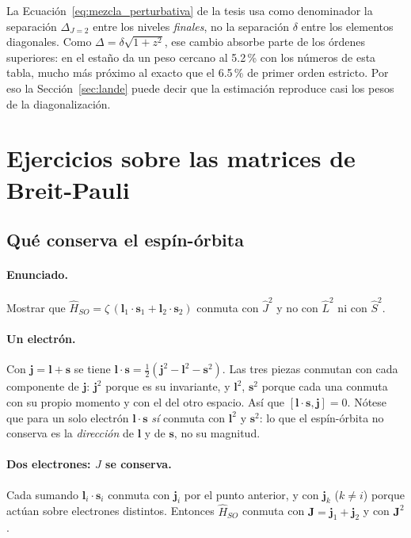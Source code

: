 \documentclass[11pt,a4paper]{article}
\begin{document}
La Ecuación~\eqref{eq:mezcla_perturbativa} de la tesis usa como denominador la separación
$\Delta_{J=2}$ entre los niveles \emph{finales}, no la separación $\delta$ entre los elementos
diagonales. Como $\Delta = \delta\sqrt{1+z^2}$, ese cambio absorbe parte de los órdenes
superiores: en el estaño da un peso cercano al 5.2\,\% con los números de esta tabla, mucho más
próximo al exacto que el 6.5\,\% de primer orden estricto. Por eso la Sección~\ref{sec:lande}
puede decir que la estimación reproduce casi los pesos de la diagonalización.

\section{Ejercicios sobre las matrices de Breit-Pauli}
\label{det:ejercicios_bp}

\subsection{Qué conserva el espín-órbita}

\paragraph{Enunciado.} Mostrar que $\hat{H}_{SO} = \zeta\,(\mathbf{l}_1\cdot\mathbf{s}_1 + \mathbf{l}_2\cdot\mathbf{s}_2)$
conmuta con $\hat{J}^2$ y no con $\hat{L}^2$ ni con $\hat{S}^2$.

\paragraph{Un electrón.} Con $\mathbf{j} = \mathbf{l} + \mathbf{s}$ se tiene
$\mathbf{l}\cdot\mathbf{s} = \tfrac{1}{2}(\mathbf{j}^2 - \mathbf{l}^2 - \mathbf{s}^2)$. Las tres piezas
conmutan con cada componente de $\mathbf{j}$: $\mathbf{j}^2$ porque es su invariante, y
$\mathbf{l}^2$, $\mathbf{s}^2$ porque cada una conmuta con su propio momento y con el del otro
espacio. Así que $[\mathbf{l}\cdot\mathbf{s}, \mathbf{j}] = 0$. Nótese que para un solo electrón
$\mathbf{l}\cdot\mathbf{s}$ \emph{sí} conmuta con $\mathbf{l}^2$ y $\mathbf{s}^2$: lo que el
espín-órbita no conserva es la \emph{dirección} de $\mathbf{l}$ y de $\mathbf{s}$, no su magnitud.

\paragraph{Dos electrones: $J$ se conserva.} Cada sumando $\mathbf{l}_i\cdot\mathbf{s}_i$ conmuta con
$\mathbf{j}_i$ por el punto anterior, y con $\mathbf{j}_k$ ($k\neq i$) porque actúan sobre electrones
distintos. Entonces $\hat{H}_{SO}$ conmuta con $\mathbf{J} = \mathbf{j}_1 + \mathbf{j}_2$ y con
$\mathbf{J}^2$.
\end{document}
